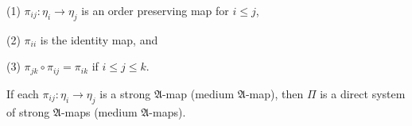 (1) $\pi_{ij} : \eta_i \rightarrow \eta_j$ is an order preserving map for $i \leq j$,

(2) $\pi_{ii}$ is the identity map, and

(3) $\pi_{jk} \circ \pi_{ij} = \pi_{ik}$ if $i \leq j \leq k$.

If each $\pi_{ij} : \eta_i \rightarrow \eta_j$ is a strong $\mathfrak{A}$-map (medium $\mathfrak{A}$-map), then $\Pi$ is a direct system of strong $\mathfrak{A}$-maps (medium $\mathfrak{A}$-maps).
